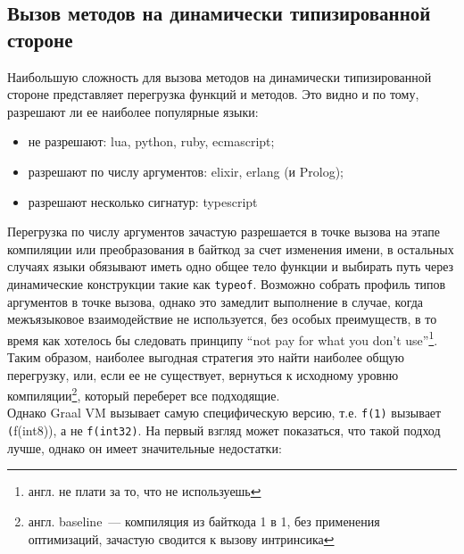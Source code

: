 \documentclass[times,specification,annotation]{itmo-student-thesis}
\begin{document}
\subsection{Вызов методов на динамически типизированной стороне}
Наибольшую сложность для вызова методов на динамически типизированной стороне представляет перегрузка функций и методов. Это видно и по тому, разрешают ли ее наиболее популярные языки:
\begin{itemize}
	\item не разрешают: lua, python, ruby, ecmascript;
	\item разрешают по числу аргументов: elixir, erlang (и Prolog);
	\item разрешают несколько сигнатур: typescript
\end{itemize}
Перегрузка по числу аргументов зачастую разрешается в точке вызова на этапе компиляции или преобразования в байткод за счет изменения имени, в остальных случаях языки обязывают иметь одно общее тело функции и выбирать путь через динамические конструкции такие как \texttt{typeof}. Возможно собрать профиль типов аргументов в точке вызова, однако это замедлит выполнение в случае, когда межъязыковое взаимодействие не используется, без особых преимуществ, в то время как хотелось бы следовать принципу ``not pay for what you don't use''\footnote{англ. не плати за то, что не используешь}. Таким образом, наиболее выгодная стратегия это найти наиболее общую перегрузку, или, если ее не существует, вернуться к исходному уровню компиляции\footnote{англ. baseline~--- компиляция из байткода 1 в 1, без применения оптимизаций, зачастую сводится к вызову интринсика}, который переберет все подходящие.\\
Однако Graal VM вызывает самую специфическую версию, т.е. \texttt{f(1)} вызывает \texttt(f(int8)), а не \texttt{f(int32)}. На первый взгляд может показаться, что такой подход лучше, однако он имеет значительные недостатки:\\
\end{document}
